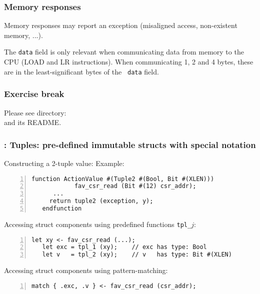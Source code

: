 \begin{frame}[fragile]
\frametitle{Memory responses}

\footnotesize

Memory responses may report an exception (misaligned access,
non-existent memory, ...).

\vspace{2ex}


\vspace{4ex}


\vspace{1ex}

The {\tt data} field is only relevant when communicating data from
memory to the CPU (LOAD and LR instructions).  When communicating 1, 2
and 4 bytes, these are in the least-significant bytes of the {\tt
data} field.

\end{frame}


\begin{frame}
\frametitle{\EmojiExercise \hmm Exercise break}

Please see directory:  \\
and its README.

\end{frame}


\begin{frame}[fragile]
\frametitle{{\BSV}: Tuples: pre-defined immutable structs with special notation}

\footnotesize

Constructing a 2-tuple value: Example:
\begin{Verbatim}[frame=single, numbers=left, label=from src\_Common/CSRs.bsv]
   function ActionValue #(Tuple2 #(Bool, Bit #(XLEN)))
            fav_csr_read (Bit #(12) csr_addr);
      ...
	 return tuple2 (exception, y);
   endfunction
\end{Verbatim}

\PAUSE{\vspace{2ex}}

Accessing struct components using predefined functions {\tt tpl\_$j$}:
\begin{Verbatim}[frame=single, numbers=left]
   let xy <- fav_csr_read (...);
   let exc = tpl_1 (xy);    // exc has type: Bool
   let v   = tpl_2 (xy);    // v   has type: Bit #(XLEN)
\end{Verbatim}

\PAUSE{\vspace{2ex}}

Accessing struct components using pattern-matching:
\begin{Verbatim}[frame=single, numbers=left]
   match { .exc, .v } <- fav_csr_read (csr_addr);
\end{Verbatim}

\end{frame}

